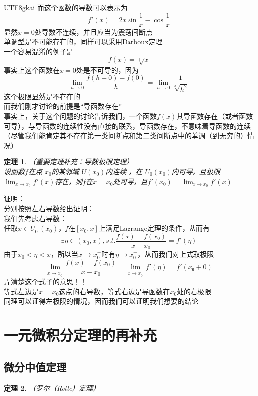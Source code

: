 \documentclass{article}
\newtheorem{theorem}{定理}[subsection]
\begin{document}
\begin{CJK}{UTF8}{gkai}
而这个函数的导数可以表示为
\[f'(x) = 2x\sin \frac{1}{x} - \cos\frac{1}{x}\]
显然$x=0$处导数不连续，并且应当为震荡间断点\\

单调型是不可能存在的，同样可以采用Darboux定理\\

一个容易混淆的例子是
\[f(x)=\sqrt[3]{x}\]
事实上这个函数在$x=0$处是不可导的，因为
\[\lim_{h\to 0 }\dfrac{f(h+0)-f(0)}{h}=\lim_{h\to 0} \dfrac{1}{\sqrt[3]{h^2}}\]
这个极限显然是不存在的\\

而我们刚才讨论的前提是“导函数存在”\\

事实上，关于这个问题的讨论告诉我们，一个函数$f(x)$其导函数存在（或者函数可导），与导函数的连续性没有直接的联系，导函数存在，不意味着导函数的连续（尽管我们能肯定其不存在第一类间断点和第二类间断点中的单调（到无穷的）情况）\\

\begin{theorem} （重要定理补充：导数极限定理）\\

设函数$f$在点 $x_0$的某邻域 $U(x_0)$内连续 ，在 $U_0(x_0)$内可导，且极限$\lim_{x\to x_0}f'(x)$存在，则$f$在$x=x_0$处可导，且$f'(x_0) = \lim_{x\to x_0}f'(x)$\\
\end{theorem}

证明：\\
分别按照左右导数给出证明：\\
我们先考虑右导数：\\
任取$x\in U_0^{+}(x_0)$，$f$在$[x_0,x]$上满足Lagrange定理的条件，从而有
\[\exists \eta \in (x_0,x),s.t.\dfrac{f(x)-f(x_0)}{x-x_0}=f'(\eta)\]
由于$x_0 < \eta < x$，所以当$x\to x_0^+ $时有$\eta \to x_0^+$，从而我们对上式取极限
\[\lim_{x\to x_0^+}\dfrac{f(x)-f(x_0)}{x-x_0} = \lim_{x\to x_0^+} f'(\eta)= f'(x_0+0)\]
弄清楚这个式子的意思！！\\
等式左边是$x=x_0$这点的右导数，等式右边是导函数在$x_0$处的右极限\\
同理可以证得左极限的情况，因而我们可以证明我们想要的结论\\

\section{一元微积分定理的再补充}
\subsection{微分中值定理}
\begin{theorem}（罗尔（Rolle）定理）


\end{theorem}
\end{CJK}
\end{document}
